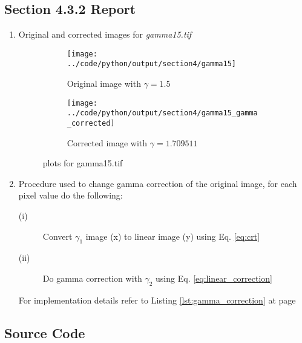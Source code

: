 \documentclass[a4paper,11pt]{article}
\newcommand{\refEq}[1]{Eq. \ref{#1}}
\newcommand{\reflst}[1]{Listing \ref{#1} at page \pageref{#1}}
\begin{document}
\subsection*{Section 4.3.2 Report} 
\begin{enumerate}
\item Original and corrected images for \textit{gamma15.tif}
\begin{figure}[!hp]
 \centering
 \begin{subfigure}{0.45\textwidth}
 \centering
 \texttt{[image: ../code/python/output/section4/gamma15]}
 \caption{Original image with $\gamma=1.5$}
\end{subfigure}
\begin{subfigure}{0.45\textwidth}
 \centering
 \texttt{[image: ../code/python/output/section4/gamma15\_gamma\_corrected]}
 \caption{Corrected image with $\gamma=1.709511$}
\end{subfigure}  
 \caption{plots for gamma15.tif}
\end{figure}

\item Procedure used to change gamma correction of the original image, for each pixel value do the following:

\begin{description}
 \item [(i)] Convert $\gamma_1$ image (x) to linear image (y) using \refEq{eq:crt}
 \item [(ii)] Do gamma correction with $\gamma_2$ using \refEq{eq:linear_correction}
\end{description}


For implementation details refer to \reflst{lst:gamma_correction}

\end{enumerate}


\newpage
\subsection*{Source Code}%



\newpage
\end{document}
